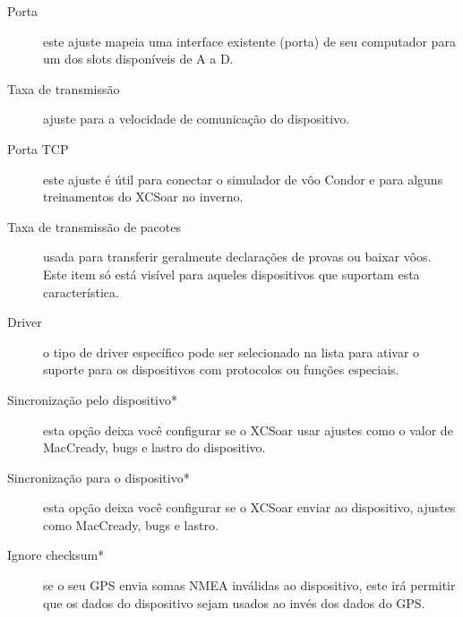 \begin{description}
\item[Porta] este ajuste mapeia uma interface existente (porta) de seu computador para um dos slots disponíveis de A a D.
\item[Taxa de transmissão]  ajuste para a velocidade de comunicação do dispositivo.
\item[Porta TCP]  este ajuste é útil para conectar o simulador de vôo Condor e para alguns treinamentos do XCSoar no inverno.
\item[Taxa de transmissão de pacotes]  usada para transferir geralmente declarações de provas ou baixar vôos.  Este item só está visível para aqueles dispositivos que suportam esta característica.
\item[Driver] o tipo de driver específico pode ser selecionado na lista para ativar o suporte para os dispositivos com protocolos ou funções especiais.
\item[Sincronização pelo dispositivo*]  esta opção deixa você configurar se o XCSoar usar ajustes como o valor de MacCready, bugs e lastro do dispositivo.
\item[Sincronização para o dispositivo*]  esta opção deixa você configurar se o XCSoar enviar ao dispositivo, ajustes como MacCready, bugs e lastro.
\item[Ignore checksum*] se o seu GPS envia somas NMEA inválidas ao dispositivo, este irá permitir que os dados do dispositivo sejam usados ao invés dos dados do GPS. 
\end{description}

